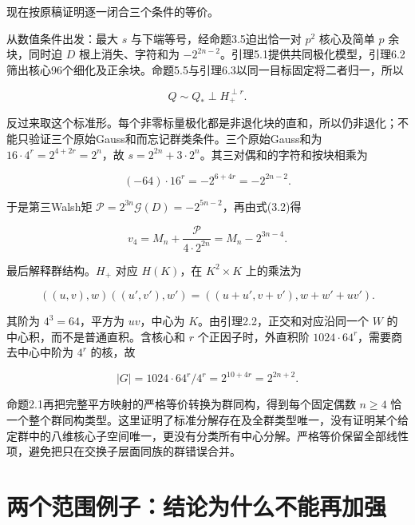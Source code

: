 \documentclass[UTF8,fontset=fandol,zihao=-4,openany,oneside]{ctexbook}
\begin{document}
现在按原稿证明逐一闭合三个条件的等价。



从数值条件出发：最大 \(s\) 与下端等号，经命题3.5迫出恰一对 \(p^2\) 核心及简单 \(p\) 余块，同时迫 \(D\) 根上消失、字符和为 \(-2^{2n-2}\)。引理5.1提供共同极化模型，引理6.2筛出核心96个细化及正余块。命题5.5与引理6.3以同一目标固定将二者归一，所以



\[
Q\sim Q_*\perp H_+^{\perp r}.
\]



反过来取这个标准形。每个非零标量极化都是非退化块的直和，所以仍非退化；不能只验证三个原始Gauss和而忘记群类条件。三个原始Gauss和为 \(16\cdot4^r=2^{4+2r}=2^n\)，故 \(s=2^{2n}+3\cdot2^n\)。其三对偶和的字符和按块相乘为



\[
(-64)\cdot16^r=-2^{6+4r}=-2^{2n-2}.
\]



于是第三Walsh矩 \(\mathcal P=2^{3n}\mathcal G(D)=-2^{5n-2}\)，再由式(3.2)得



\[
v_4=M_n+\frac{\mathcal P}{4\cdot2^{2n}}
=M_n-2^{3n-4}.
\]



最后解释群结构。\(H_+\) 对应 \(H(K)\)，在 \(K^2\times K\) 上的乘法为



\[
((u,v),w)((u',v'),w')
=((u+u',v+v'),w+w'+uv').
\]



其阶为 \(4^3=64\)，平方为 \(uv\)，中心为 \(K\)。由引理2.2，正交和对应沿同一个 \(W\) 的中心积，而不是普通直积。含核心和 \(r\) 个正因子时，外直积阶 \(1024\cdot64^r\)，需要商去中心中阶为 \(4^r\) 的核，故



\[
|G|=1024\cdot64^r/4^r
=2^{10+4r}=2^{2n+2}.
\]



命题2.1再把完整平方映射的严格等价转换为群同构，得到每个固定偶数 \(n\ge4\) 恰一个整个群同构类型。这里证明了标准分解存在及全群类型唯一，没有证明某个给定群中的八维核心子空间唯一，更没有分类所有中心分解。严格等价保留全部线性项，避免把只在交换子层面同族的群错误合并。



\chapter{两个范围例子：结论为什么不能再加强}
\end{document}
